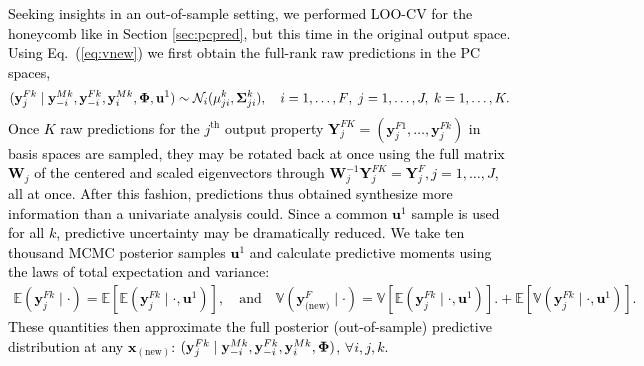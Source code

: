 \documentclass[12pt]{article}
\newcommand{\blu}[1]{\textcolor{black}{#1}} %
\newcommand{\blunew}[1]{\textcolor{black}{#1}} %
\newcommand{\bm}[1]{\mbox{\boldmath $#1$}}
\begin{document}
\blu{
Seeking insights in an out-of-sample setting, we performed LOO-CV for the
honeycomb like in Section \ref{sec:pcpred}, but this time in the original output space. Using
Eq.~(\ref{eq:vnew}) we first obtain the full-rank raw
predictions   in  the PC spaces, $$(\mathbf{y}^{Fk}_{j}  \mid
\mathbf{y}^{Mk}_{-i},  \mathbf{y}^{Fk}_{-i},
 \mathbf{y}^{Mk}_{i},  \bm{\Phi}, \mathbf{u}^1) 
 \sim \mathcal{N}_{i}(\blunew{\mathbf{\mu}}^k_{ji}, \blunew{\mathbf{\Sigma}}^k_{ji} ), 
 \quad i =1, \dots, \blunew{F},  \; j = 1, \dots, J, \; k =1, \dots, K.$$ 
Once $K$ raw predictions for the $j^{\mathrm{th}}$ output property
$\mathbf{Y}_j^{FK} = (\mathbf{y}_j^{F1}, \dots, \mathbf{y}_j^{Fk})$ in basis
spaces are sampled, they may be rotated back at once using the full matrix
$\mathbf{W}_j$ of the centered and scaled eigenvectors through
$\mathbf{W}^{-1}_j\mathbf{Y}_j^{FK} = \mathbf{Y}_j^F, j=1, \dots, J$, all at once. 
After this fashion, predictions thus obtained synthesize more information than a univariate analysis
could. Since a common  $\mathbf{u}^1$ sample is used for all $k$, predictive
uncertainty may be dramatically reduced.
We take ten thousand MCMC posterior samples $\mathbf{u}^1$ and calculate predictive moments 
using the laws  
 of total expectation and variance:
\begin{align*}
\mathbb{E}(\mathbf{y}^{Fk}_j  \mid \cdot ) = 
\mathbb{E}[\mathbb{E}(\mathbf{y}^{Fk}_j  \mid \cdot, \mathbf{u}^1 )], \quad \mbox{and} \quad
\mathbb{V}(\mathbf{y}^F_{\text{(new)}}  \mid \cdot ) = 
 \mathbb{V}[\mathbb{E}(\mathbf{y}^{Fk}_j   \mid \cdot, \mathbf{u}^1)].
+ \mathbb{E}[\mathbb{V}(\mathbf{y}^{Fk}_j   \mid \cdot, \mathbf{u}^1)].
\end{align*}
These quantities then approximate the full posterior 
(out-of-sample) predictive distribution 
at any $\mathbf{x}_{\mathrm{(new)}}$:  
$(\mathbf{y}^{Fk}_{j}  \mid \mathbf{y}^{Mk}_{-i},  \mathbf{y}^{Fk}_{-i}, 
 \mathbf{y}^{Mk}_{i},  \bm{\Phi})$,  $\forall i,j,k$. }
\end{document}
